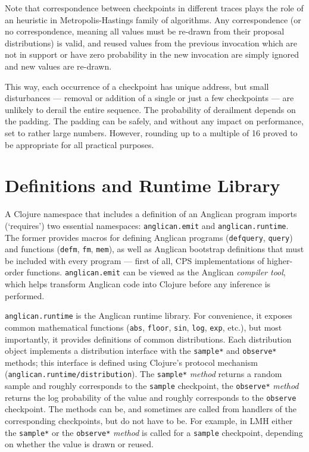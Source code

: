 \documentclass[preprint]{sigplanconf}
\begin{document}
Note that correspondence between checkpoints in different
traces plays the role of an heuristic in Metropolis-Hastings
family of algorithms. Any correspondence (or no correspondence,
meaning all values must be re-drawn from their proposal
distributions) is valid, and reused values from the previous
invocation which are not in support or have zero probability in
the new invocation are simply ignored and new values are
re-drawn.

This way, each occurrence of a checkpoint has unique address,
but small disturbances --- removal or addition of a single or just
a few checkpoints --- are unlikely to derail the entire sequence.
The probability of derailment depends on the padding. The
padding can be safely, and without any impact on performance,
set to rather large numbers. However, rounding up to a multiple
of 16 proved to be appropriate for all practical purposes.
\iftoggle{full}{%

Function \texttt{checkpoint-id} in the
\texttt{anglican.inference} namespace automates generation of
checkpoint addresses and can be used from any inference
algorithm.
}{%
}%

\section{Definitions and Runtime Library}
\label{seq:runtime}

A Clojure namespace that includes a definition of an Anglican
program imports (`requires') two essential namespaces:
\texttt{anglican.emit} and \texttt{anglican.runtime}. The former
provides macros for defining Anglican programs
(\texttt{defquery}, \texttt{query}) and functions
(\texttt{defm}, \texttt{fm}, \texttt{mem}), as well as Anglican
bootstrap definitions that must be included with every program
--- first of all, CPS implementations of higher-order functions.
\texttt{anglican.emit} can be viewed as the Anglican
\textit{compiler tool}, which helps transform Anglican code into
Clojure before any inference is performed.

\texttt{anglican.runtime} is the Anglican runtime library. For
convenience, it exposes common mathematical functions
(\texttt{abs}, \texttt{floor}, \texttt{sin}, \texttt{log},
\texttt{exp}, etc.), but most importantly, it provides
definitions of common distributions. Each distribution object implements a
distribution interface with the \texttt{sample*} and \texttt{observe*} methods;
this interface is defined using Clojure's protocol mechanism
(\texttt{anglican.{\linebreak[0]}runtime/{\linebreak[0]}distribution}).
The \texttt{sample*} \textit{method} returns a random sample and
roughly corresponds to the \texttt{sample} checkpoint,
the \texttt{observe*} \textit{method} returns the log probability
of the value and roughly corresponds to the \texttt{observe}
checkpoint. The methods can be, and sometimes are called from
handlers of the corresponding checkpoints, but do not have to
be. For example, in LMH either the \texttt{sample*} or
the \texttt{observe*} \textit{method} is called for a
\texttt{sample} checkpoint, depending on whether the value is
drawn or reused.
\end{document}
